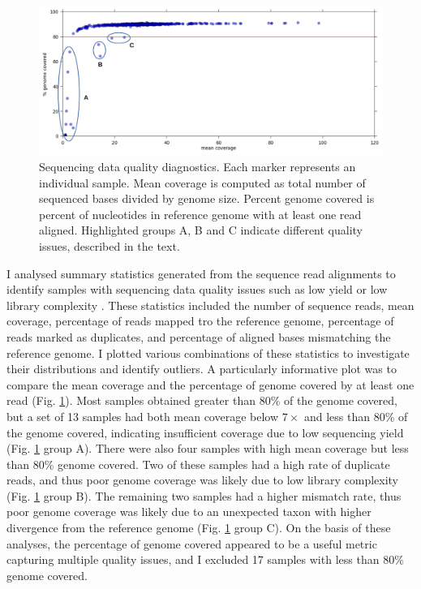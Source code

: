 \documentclass[a4paper,11pt,abstracton,hidelinks]{scrartcl}
\begin{document}
\begin{figure}[t!]
\centering
\includegraphics[width=\textwidth]{artwork/chapter3/coverage.pdf}
\caption{Sequencing data quality diagnostics.
%
Each marker represents an individual sample.
%
Mean coverage is computed as total number of sequenced bases divided by genome size.
%
Percent genome covered is percent of nucleotides in reference genome with at least one read aligned.
%
Highlighted groups A, B and C indicate different quality issues, described in the text.
}
%
\label{fig:coverage}
\end{figure}


I analysed summary statistics generated from the sequence read alignments to identify samples with sequencing data quality issues such as low yield or low library complexity .
%
These statistics included the number of sequence reads, mean coverage, percentage of reads mapped tro the reference genome, percentage of reads marked as duplicates, and percentage of aligned bases mismatching the reference genome.
%
I plotted various combinations of these statistics to investigate their distributions and identify outliers.
%
A particularly informative plot was to compare the mean coverage and the percentage of genome covered by at least one read (Fig. \ref{fig:coverage}).
%
Most samples obtained greater than 80\% of the genome covered, but a set of 13 samples had both mean coverage below $7\times$ and less than 80\% of the genome covered, indicating insufficient coverage due to low sequencing yield (Fig. \ref{fig:coverage} group A).
%
There were also four samples with high mean coverage but less than 80\% genome covered.
%
Two of these samples had a high rate of duplicate reads, and thus poor genome coverage was likely due to low library complexity (Fig. \ref{fig:coverage} group B).
%
The remaining two samples had a higher mismatch rate, thus poor genome coverage was likely due to an unexpected taxon with higher divergence from the reference genome (Fig. \ref{fig:coverage} group C).
%
On the basis of these analyses, the percentage of genome covered appeared to be a useful metric capturing multiple quality issues, and I excluded 17 samples with less than 80\% genome covered.
%
\end{document}
